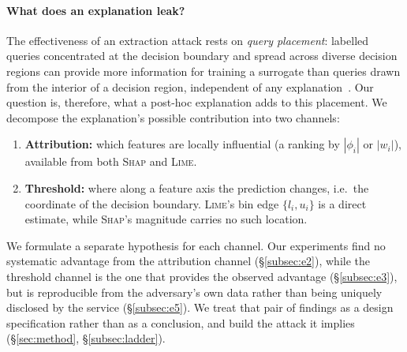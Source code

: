 \documentclass[sigconf,anonymous,review]{acmart}
\begin{document}
\paragraph{What does an explanation leak?}
The effectiveness of an extraction attack rests on \emph{query placement}: labelled queries
concentrated at the decision boundary and spread across diverse decision regions can provide more information for training a surrogate than queries drawn from the interior of a decision region, independent of any
explanation~\cite{tramer2016stealing,pal2020activethief}. Our question is, therefore, what a post-hoc explanation
adds to this placement. We decompose the explanation's possible contribution into
two channels:
\begin{enumerate}
  \item \textbf{Attribution:} which features are locally influential
  (a ranking by $|\phi_i|$ or $|w_i|$), available from both \textsc{Shap} and
  \textsc{Lime}.
  \item \textbf{Threshold:} where along a feature axis the prediction
  changes, i.e.\ the coordinate of the decision boundary. \textsc{Lime}'s bin edge
  $\{l_i, u_i\}$ is a direct estimate, while \textsc{Shap}'s magnitude carries no such
  location.
\end{enumerate}
We formulate a separate hypothesis for each channel. Our experiments find no systematic advantage from the attribution channel (\S\ref{subsec:e2}), while the threshold
channel is the one that
provides the observed advantage (\S\ref{subsec:e3}), but is reproducible from the adversary's own data rather than being uniquely disclosed by the service (\S\ref{subsec:e5}). We treat that pair of findings as a design specification rather
than as a conclusion, and build the attack it implies (\S\ref{sec:method}, \S\ref{subsec:ladder}).
\end{document}

